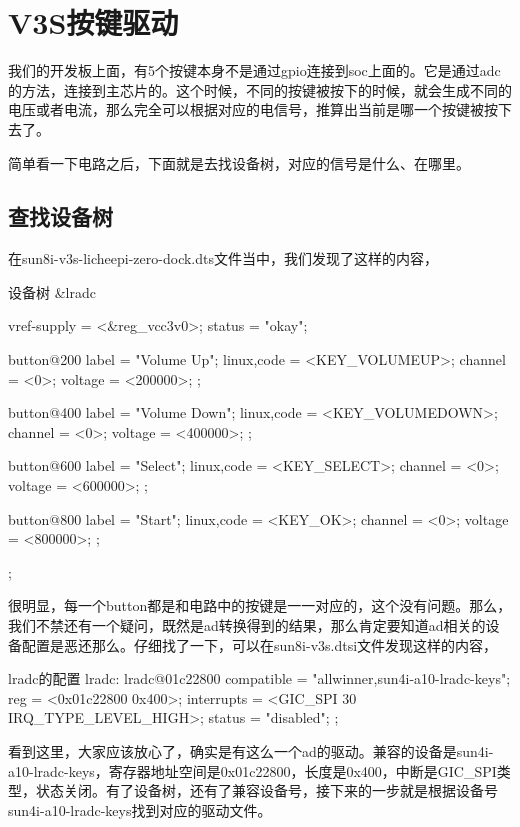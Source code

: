 \documentclass[lang=cn,newtx,10pt,scheme=chinese]{elegantbook}
\begin{document}
\chapter{V3S按键驱动}

我们的开发板上面，有5个按键本身不是通过gpio连接到soc上面的。它是通过adc的方法，连接到主芯片的。这个时候，不同的按键被按下的时候，就会生成不同的电压或者电流，那么完全可以根据对应的电信号，推算出当前是哪一个按键被按下去了。

简单看一下电路之后，下面就是去找设备树，对应的信号是什么、在哪里。

\section{查找设备树}

在sun8i-v3s-licheepi-zero-dock.dts文件当中，我们发现了这样的内容，

\begin{mycode}{设备树}
&lradc {
    vref-supply = <&reg_vcc3v0>;
    status = "okay";
 
    button@200 {
        label = "Volume Up";
        linux,code = <KEY_VOLUMEUP>;
        channel = <0>;
        voltage = <200000>;
    };
 
    button@400 {
        label = "Volume Down";
        linux,code = <KEY_VOLUMEDOWN>;
        channel = <0>;
        voltage = <400000>;
    };
 
    button@600 {
        label = "Select";
        linux,code = <KEY_SELECT>;
        channel = <0>;
        voltage = <600000>;
    };
 
    button@800 {
        label = "Start";
        linux,code = <KEY_OK>;
        channel = <0>;
        voltage = <800000>;
    };
};
\end{mycode}

很明显，每一个button都是和电路中的按键是一一对应的，这个没有问题。那么，我们不禁还有一个疑问，既然是ad转换得到的结果，那么肯定要知道ad相关的设备配置是恶还那么。仔细找了一下，可以在sun8i-v3s.dtsi文件发现这样的内容，

\begin{mycode}{lradc的配置}
lradc: lradc@01c22800 {
    compatible = "allwinner,sun4i-a10-lradc-keys";
    reg = <0x01c22800 0x400>;
    interrupts = <GIC_SPI 30 IRQ_TYPE_LEVEL_HIGH>;
    status = "disabled";
};
\end{mycode}

看到这里，大家应该放心了，确实是有这么一个ad的驱动。兼容的设备是sun4i-a10-lradc-keys，寄存器地址空间是0x01c22800，长度是0x400，中断是GIC\_SPI类型，状态关闭。有了设备树，还有了兼容设备号，接下来的一步就是根据设备号sun4i-a10-lradc-keys找到对应的驱动文件。
\end{document}
